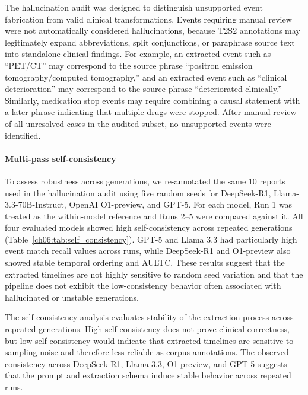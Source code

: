 


The hallucination audit was designed to distinguish unsupported event fabrication from valid clinical transformations.
Events requiring manual review were not automatically considered hallucinations, because T2S2 annotations may legitimately expand abbreviations, split conjunctions, or paraphrase source text into standalone clinical findings.
For example, an extracted event such as ``PET/CT'' may correspond to the source phrase ``positron emission tomography/computed tomography,'' and an extracted event such as ``clinical deterioration'' may correspond to the source phrase ``deteriorated clinically.''
Similarly, medication stop events may require combining a causal statement with a later phrase indicating that multiple drugs were stopped.
After manual review of all unresolved cases in the audited subset, no unsupported events were identified.


\FloatBarrier
\paragraph{Multi-pass self-consistency}
\label{ch06:apd:self_consistency_results}
To assess robustness across generations, we re-annotated the same 10 reports used in the hallucination audit using five random seeds for DeepSeek-R1, Llama-3.3-70B-Instruct, OpenAI O1-preview, and GPT-5.
For each model, Run 1 was treated as the within-model reference and Runs 2--5 were compared against it.
All four evaluated models showed high self-consistency across repeated generations (Table~\ref{ch06:tab:self_consistency}).
GPT-5 and Llama 3.3 had particularly high event match recall values across runs, while DeepSeek-R1 and O1-preview also showed stable temporal ordering and AULTC.
These results suggest that the extracted timelines are not highly sensitive to random seed variation and that the pipeline does not exhibit the low-consistency behavior often associated with hallucinated or unstable generations.





The self-consistency analysis evaluates stability of the extraction process across repeated generations.
High self-consistency does not prove clinical correctness, but low self-consistency would indicate that extracted timelines are sensitive to sampling noise and therefore less reliable as corpus annotations.
The observed consistency across DeepSeek-R1, Llama 3.3, O1-preview, and GPT-5 suggests that the prompt and extraction schema induce stable behavior across repeated runs.


